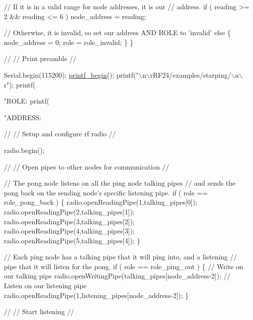 \begin{DoxyCodeInclude}
    \textcolor{comment}{// If it is in a valid range for node addresses, it is our}
    \textcolor{comment}{// address.}
    \textcolor{keywordflow}{if} ( reading >= 2 && reading <= 6 )
      node\_address = reading;

    \textcolor{comment}{// Otherwise, it is invalid, so set our address AND ROLE to 'invalid'}
    \textcolor{keywordflow}{else}
    \{
      node\_address = 0;
      role = role\_invalid;
    \}
  \}

  \textcolor{comment}{//}
  \textcolor{comment}{// Print preamble}
  \textcolor{comment}{//}

  Serial.begin(115200);
  \hyperlink{printf_8h_afc0d9ca32710dff550ebe56ab6b39d23}{printf\_begin}();
  printf(\textcolor{stringliteral}{"\(\backslash\)n\(\backslash\)rRF24/examples/starping/\(\backslash\)n\(\backslash\)r"});
  printf(\textcolor{stringliteral}{"ROLE: %
  printf(\textcolor{stringliteral}{"ADDRESS: %

  \textcolor{comment}{//}
  \textcolor{comment}{// Setup and configure rf radio}
  \textcolor{comment}{//}

  radio.begin();

  \textcolor{comment}{//}
  \textcolor{comment}{// Open pipes to other nodes for communication}
  \textcolor{comment}{//}

  \textcolor{comment}{// The pong node listens on all the ping node talking pipes}
  \textcolor{comment}{// and sends the pong back on the sending node's specific listening pipe.}
  \textcolor{keywordflow}{if} ( role == role\_pong\_back )
  \{
    radio.openReadingPipe(1,talking\_pipes[0]);
    radio.openReadingPipe(2,talking\_pipes[1]);
    radio.openReadingPipe(3,talking\_pipes[2]);
    radio.openReadingPipe(4,talking\_pipes[3]);
    radio.openReadingPipe(5,talking\_pipes[4]);
  \}

  \textcolor{comment}{// Each ping node has a talking pipe that it will ping into, and a listening}
  \textcolor{comment}{// pipe that it will listen for the pong.}
  \textcolor{keywordflow}{if} ( role == role\_ping\_out )
  \{
    \textcolor{comment}{// Write on our talking pipe}
    radio.openWritingPipe(talking\_pipes[node\_address-2]);
    \textcolor{comment}{// Listen on our listening pipe}
    radio.openReadingPipe(1,listening\_pipes[node\_address-2]);
  \}

  \textcolor{comment}{//}
  \textcolor{comment}{// Start listening}
  \textcolor{comment}{//}

}}
\end{DoxyCodeInclude}
